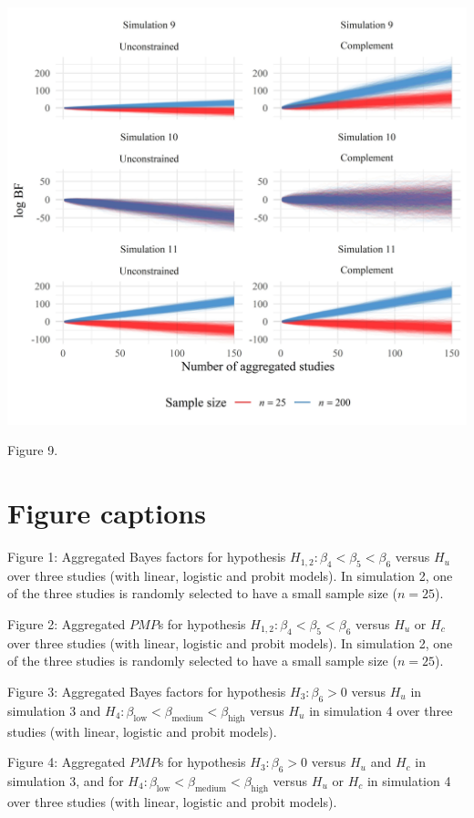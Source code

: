 \documentclass[
]{interact}
\begin{document}
\includegraphics[width=1\textwidth,height=\textheight]{figures/figure-9.jpeg}

Figure 9.

\hypertarget{figure-captions}{%
\section{Figure captions}\label{figure-captions}}

Figure 1: Aggregated Bayes factors for hypothesis
\(H_{1,2}: \beta_4 < \beta_5 < \beta_6\) versus \(H_u\) over three
studies (with linear, logistic and probit models). In simulation 2, one
of the three studies is randomly selected to have a small sample size
(\(n = 25\)).

Figure 2: Aggregated \(PMP\)s for hypothesis
\(H_{1,2}: \beta_4 < \beta_5 < \beta_6\) versus \(H_u\) or \(H_c\) over
three studies (with linear, logistic and probit models). In simulation
2, one of the three studies is randomly selected to have a small sample
size (\(n = 25\)).

Figure 3: Aggregated Bayes factors for hypothesis \(H_3: \beta_6 > 0\)
versus \(H_u\) in simulation 3 and
\(H_4: \beta_{\text{low}} < \beta_{\text{medium}} < \beta_{\text{high}}\)
versus \(H_u\) in simulation 4 over three studies (with linear, logistic
and probit models).

Figure 4: Aggregated \(PMP\)s for hypothesis \(H_3: \beta_6 > 0\) versus
\(H_u\) and \(H_c\) in simulation 3, and for
\(H_4: \beta_{\text{low}} < \beta_{\text{medium}} < \beta_{\text{high}}\)
versus \(H_u\) or \(H_c\) in simulation 4 over three studies (with
linear, logistic and probit models).
\end{document}
